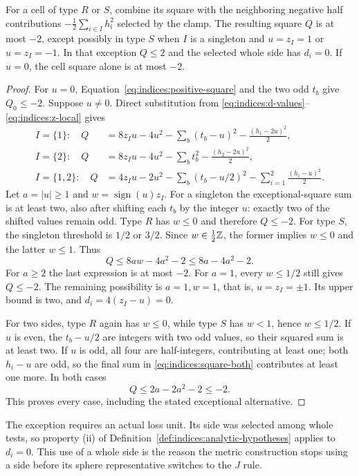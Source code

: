 \begin{lemma}\label{lem:indices:positive-square}
For a cell of type $R$ or $S$, combine its square with the neighboring
negative half contributions $-\frac12\sum_{i\in I}h_i^2$ selected by the
clamp.  The resulting square $Q$ is at most $-2$, except possibly in type
$S$ when $I$ is a singleton and $u=z_I=1$ or $u=z_I=-1$.
In that exception $Q\le2$ and the selected whole side has $d_i=0$.
If $u=0$, the cell square alone is at most $-2$.
\end{lemma}
\begin{proof}
For $u=0$, Equation~\eqref{eq:indices:positive-square} and the two odd
$t_b$ give $Q_0\le-2$.  Suppose $u\ne0$.  Direct substitution from
\eqref{eq:indices:d-values}--\eqref{eq:indices:z-local} gives
\begin{align}
 I=\{1\}:\quad Q
 &=8z_Iu-4u^2-\sum_b(t_b-u)^2-\frac{(h_1-2u)^2}{2},
 \label{eq:indices:square-one}\\
 I=\{2\}:\quad Q
 &=8z_Iu-4u^2-\sum_bt_b^2-\frac{(h_2-2u)^2}{2},
 \label{eq:indices:square-two}\\
 I=\{1,2\}:\quad Q
 &=4z_Iu-2u^2-\sum_b(t_b-u/2)^2
                     -\sum_{i=1}^2\frac{(h_i-u)^2}{2}.
 \label{eq:indices:square-both}
\end{align}
Let $a=|u|\ge1$ and $w=\operatorname{sign}(u)z_I$.
For a singleton the exceptional-square sum is at least two, also after
shifting each $t_b$ by the integer $u$: exactly two of the shifted values
remain odd.  Type $R$ has $w\le0$ and therefore $Q\le-2$.
For type $S$, the singleton threshold is $1/2$ or $3/2$.
Since $w\in\frac12\mathbb Z$, the former implies $w\le0$ and the latter
$w\le1$.  Thus
\[
 Q\le8aw-4a^2-2\le8a-4a^2-2.
\]
For $a\ge2$ the last expression is at most $-2$.  For $a=1$, every
$w\le1/2$ still gives $Q\le-2$.  The remaining possibility is $a=1,w=1$,
that is, $u=z_I=\pm1$.  Its upper bound is two, and
$d_i=4(z_I-u)=0$.

For two sides, type $R$ again has $w\le0$, while type $S$ has $w<1$,
hence $w\le1/2$.  If $u$ is even, the $t_b-u/2$ are integers with two
odd values, so their squared sum is at least two.  If $u$ is odd, all
four are half-integers, contributing at least one; both $h_i-u$ are odd,
so the final sum in \eqref{eq:indices:square-both} contributes at least
one more.  In both cases
\[
 Q\le2a-2a^2-2\le-2.
\]
This proves every case, including the stated exceptional alternative.
\end{proof}

The exception requires an actual loss unit.  Its side was selected among
whole tests, so property (ii) of
Definition~\ref{def:indices:analytic-hypotheses} applies to $d_i=0$.
This use of a whole side is the reason the metric construction stops using
a side before its sphere representative switches to the $J$ rule.

